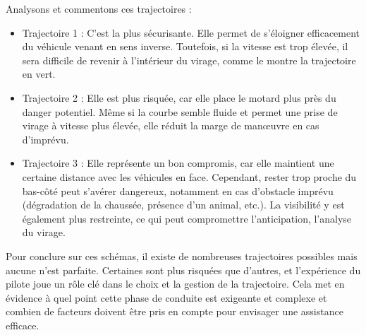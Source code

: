 Analysons et commentons ces trajectoires :
\begin{itemize}
    \item Trajectoire 1 : C’est la plus sécurisante. Elle permet de s’éloigner efficacement du véhicule venant en sens inverse. Toutefois, si la vitesse est trop élevée, il sera difficile de revenir à l’intérieur du virage, comme le montre la trajectoire en vert.
    \item Trajectoire 2 : Elle est plus risquée, car elle place le motard plus près du danger potentiel. Même si la courbe semble fluide et permet une prise de virage à vitesse plus élevée, elle réduit la marge de manœuvre en cas d’imprévu.
    \item Trajectoire 3 : Elle représente un bon compromis, car elle maintient une certaine distance avec les véhicules en face. Cependant, rester trop proche du bas-côté peut s’avérer dangereux, notamment en cas d’obstacle imprévu (dégradation de la chaussée, présence d’un animal, etc.). La visibilité y est également plus restreinte, ce qui peut compromettre l’anticipation, l'analyse du virage.
\end{itemize}
Pour conclure sur ces schémas, il existe de nombreuses trajectoires possibles mais aucune n’est parfaite. Certaines sont plus risquées que d’autres, et l’expérience du pilote joue un rôle clé dans le choix et la gestion de la trajectoire. Cela met en évidence à quel point cette phase de conduite est exigeante et complexe et combien de facteurs doivent être pris en compte pour envisager une assistance efficace.


